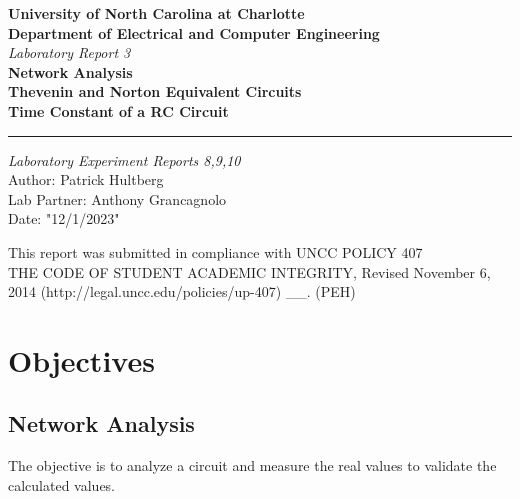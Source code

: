 \documentclass[a4paper]{article}
\begin{document}
\begin{titlepage}
\thispagestyle{fancy} %
\rhead{}
\chead{}
\rfoot{}
\cfoot{}
\lfoot{}
\renewcommand{\headrulewidth}{0pt} %
    \begin{center}
        \vspace*{1cm}
        
      
       \Large\textbf{University of North Carolina at Charlotte \\[1pt]
	Department of Electrical and Computer Engineering} \\[2pt]
\textit{Laboratory Report 3} \\[5pt]
\textbf{Network Analysis\\[5pt]
Thevenin and Norton Equivalent Circuits\\[5pt]
Time Constant of a RC Circuit\\
}

\noindent\rule{15cm}{0.4pt}
\vfill
        \vspace{0.5cm}
        \textit{Laboratory Experiment Reports 8,9,10} \\
		Author: Patrick Hultberg\\
		Lab Partner: Anthony Grancagnolo	\\
		Date: "12/1/2023" \\
        
        \vspace{1.5cm}
        
        
        
        \vfill
		\vfill
        
       \large This report was submitted in compliance with UNCC POLICY 407\\
THE CODE OF STUDENT ACADEMIC INTEGRITY, Revised November 6, 2014
(http://legal.uncc.edu/policies/up-407) \_\_. (PEH) 
        \vspace{0.8cm}
        
    

    \end{center}
\end{titlepage}


\section{Objectives}

\subsection{Network Analysis}
The objective is to analyze a circuit and measure the real values to validate the calculated values.
\end{document}
